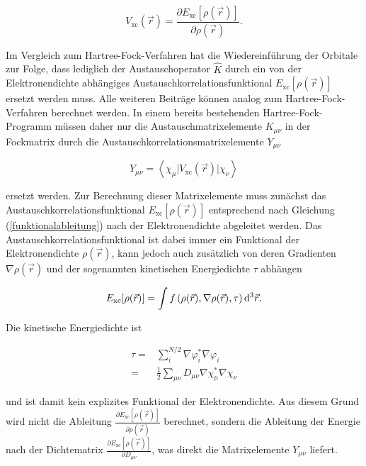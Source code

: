 \begin{equation}\label{funktionalableitung}
V_{\textrm{xc}}(\vec{r}) = \frac{\partial E_{\textrm{xc}}[\rho(\vec{r})]}{\partial \rho(\vec{r})}.
\end{equation}

Im Vergleich zum Hartree-Fock-Verfahren hat die Wiedereinführung der Orbitale zur Folge, dass lediglich der Austauschoperator $\hat{K}$ durch ein von der Elektronendichte abhängiges Austauschkorrelationsfunktional $E_{\textrm{xc}}[\rho(\vec{r})]$ ersetzt werden muss. Alle weiteren Beiträge können analog zum Hartree-Fock-Verfahren berechnet werden. In einem bereits bestehenden Hartree-Fock-Programm müssen daher nur die Austauschmatrixelemente $K_{\mu\nu}$ in der Fockmatrix durch die Austauschkorrelationsmatrixelemente $Y_{\mu\nu}$ 

\begin{equation}
Y_{\mu\nu}=\left\langle\chi_\mu\vert V_{\textrm{xc}}(\vec{r})\vert\chi_\nu\right\rangle
\end{equation}

ersetzt werden. Zur Berechnung dieser Matrixelemente muss zunächst das Austauschkorrelationsfunktional $E_{\textrm{xc}}[\rho(\vec{r})]$ entsprechend nach Gleichung (\ref{funktionalableitung}) nach der Elektronendichte abgeleitet werden. Das Austauschkorrelationsfunktional ist dabei immer ein Funktional der Elektronendichte $\rho(\vec{r})$, kann jedoch auch zusätzlich von deren Gradienten $\nabla\rho(\vec{r})$ und der sogenannten kinetischen Energiedichte $\tau$ abhängen

\begin{equation}
E_{\textrm{xc}}[\rho(\vec{r})]=\int f\left(\rho(\vec{r}),\nabla\rho(\vec{r}),\tau\right) \mathop{}\!\mathrm{d^3} \vec{r}.
\end{equation}

Die kinetische Energiedichte ist

\begin{equation}
\begin{aligned}
\tau=&\sum_i^{N/2} \nabla\varphi_i^*\nabla\varphi_i\\
=&\frac{1}{2}\sum_{\mu\nu}D_{\mu\nu}\nabla\chi_\mu^*\nabla\chi_\nu
\end{aligned}
\end{equation}

und ist damit kein explizites Funktional der Elektronendichte. Aus diesem Grund wird nicht die Ableitung $\frac{\partial E_{\textrm{xc}}[\rho(\vec{r})]}{\partial \rho(\vec{r})}$ berechnet, sondern die Ableitung der Energie nach der Dichtematrix $\frac{\partial E_{\textrm{xc}}[\rho(\vec{r})]}{\partial D_{\mu\nu}}$, was direkt die Matrixelemente $Y_{\mu\nu}$ liefert.

